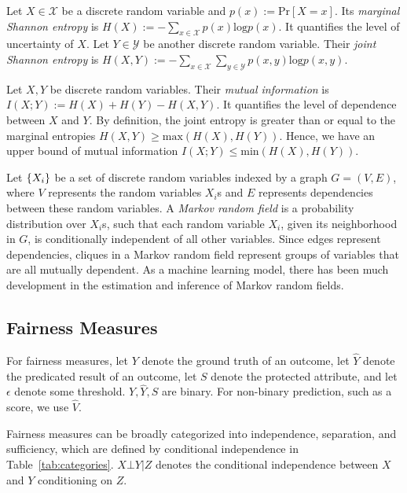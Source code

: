 \documentclass[manuscript,screen,review,anonymous]{acmart}
\DeclarePairedDelimiter{\set}{\{}{\}}
\newcommand{\prob}[1]{\text{Pr}[#1]}
\newcommand{\mi}[2]{I(#1;#2)}
\newcommand{\entropy}[1]{H(#1)}
\begin{document}
Let $X \in \mathcal{X}$ be a discrete random variable and $p(x) := \prob{X = x}$. Its \emph{marginal Shannon entropy} is $\entropy{X} := -\sum_{x \in \mathcal{X}} p(x) \text{log} p(x)$. It quantifies the level of uncertainty of $X$. Let $Y \in \mathcal{Y}$ be another discrete random variable. Their \emph{joint Shannon entropy} is $\entropy{X,Y} := -\sum_{x \in \mathcal{X}} \sum_{y \in \mathcal{Y}} p(x, y) \text{log} p(x, y)$.

Let $X,Y$ be discrete random variables. Their \emph{mutual information} is $\mi{X}{Y} := \entropy{X} + \entropy{Y} - \entropy{X,Y}$. It quantifies the level of dependence between $X$ and $Y$. By definition\cite{427884}, the joint entropy is greater than or equal to the marginal entropies $\entropy{X,Y} \geq \text{max}(\entropy{X},\entropy{Y})$. Hence, we have an upper bound of mutual information $\mi{X}{Y} \leq \text{min}(\entropy{X}, \entropy{Y})$.

Let $\set{X_i}$ be a set of discrete random variables indexed by a graph $G = (V,E)$, where $V$ represents the random variables $X_i$s and $E$ represents dependencies between these random variables. A \emph{Markov random field} is a probability distribution over $X_i$s, such that each random variable $X_i$, given its neighborhood in $G$, is conditionally independent of all other variables. Since edges represent dependencies, cliques in a Markov random field represent groups of variables that are all mutually dependent. As a machine learning model, there has been much development in the estimation and inference of Markov random fields\cite{koller2009probabilistic,murphy2023probabilistic}.

\subsection{Fairness Measures}

For fairness measures\cite{yuan2024ensuring,pessach2022review}, let $Y$ denote the ground truth of an outcome, let $\hat{Y}$ denote the predicated result of an outcome, let $S$ denote the protected attribute, and let $\epsilon$ denote some threshold. $Y, \hat{Y}, S$ are binary. For non-binary prediction, such as a score, we use $\hat{V}$.

Fairness measures can be broadly categorized into independence, separation, and sufficiency, which are defined by conditional independence in Table~\ref{tab:categories}. $X \bot Y | Z$ denotes the conditional independence between $X$ and $Y$ conditioning on $Z$.
\end{document}
